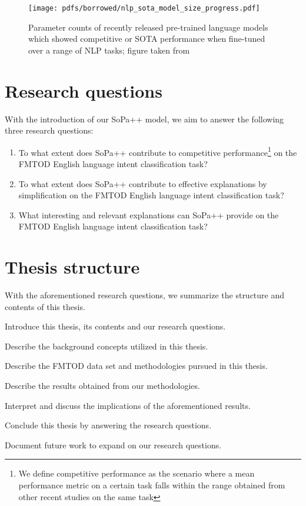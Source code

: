\begin{figure}[th]
  \centering
  \texttt{[image: pdfs/borrowed/nlp\_sota\_model\_size\_progress.pdf]}
  \caption{Parameter counts of recently released pre-trained language models
    which showed competitive or SOTA performance when fine-tuned over a range of
    NLP tasks; figure taken from \citet{sanh2019distilbert}}
  \label{fig:nlp_progress}
\end{figure}

\section{Research questions}

With the introduction of our SoPa++ model, we aim to answer the following three
research questions:

\begin{enumerate}
  \item To what extent does SoPa++ contribute to competitive
  performance\footnote{We define competitive performance as the scenario where a
    mean performance metric on a certain task falls within the range
    obtained from other recent studies on the same task} on the FMTOD
  English language intent classification task?
  \item To what extent does SoPa++ contribute to effective explanations by
  simplification on the FMTOD English language intent classification task?
  \item What interesting and relevant explanations can SoPa++ provide on the
  FMTOD English language intent classification task?
\end{enumerate}

\section{Thesis structure}

With the aforementioned research questions, we summarize the structure and
contents of this thesis.

\begin{description}[align=left]
  \item [Chapter \ref{chapter:introduction}:] Introduce this thesis, its
  contents and our research questions.
  \item [Chapter \ref{chapter:background}:] Describe the background concepts
  utilized in this thesis.
  \item [Chapter \ref{chapter:methodologies}:] Describe the FMTOD data set and
  methodologies pursued in this thesis.
  \item [Chapter \ref{chapter:results}:] Describe the results obtained from our
  methodologies.
  \item [Chapter \ref{chapter:discussion}:] Interpret and discuss the
  implications of the aforementioned results.
  \item [Chapter \ref{chapter:conclusions}:] Conclude this thesis by answering
  the research questions.
  \item [Chapter \ref{chapter:further_work}:] Document future work to expand on
  our research questions.
\end{description}


